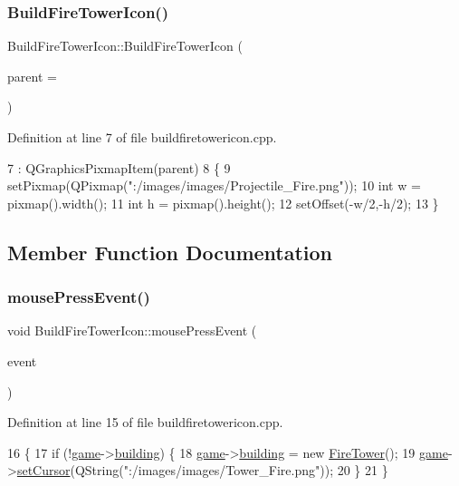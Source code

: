 \subsubsection{\texorpdfstring{Build\+Fire\+Tower\+Icon()}{BuildFireTowerIcon()}}
{\footnotesize\ttfamily Build\+Fire\+Tower\+Icon\+::\+Build\+Fire\+Tower\+Icon (\begin{DoxyParamCaption}\item[{Q\+Graphics\+Item $\ast$}]{parent = {} }\end{DoxyParamCaption})}



Definition at line 7 of file buildfiretowericon.\+cpp.


\begin{DoxyCode}
7                                                            : QGraphicsPixmapItem(parent)
8 \{
9     setPixmap(QPixmap(\textcolor{stringliteral}{":/images/images/Projectile\_Fire.png"}));
10     \textcolor{keywordtype}{int} w = pixmap().width();
11     \textcolor{keywordtype}{int} h = pixmap().height();
12     setOffset(-w/2,-h/2);
13 \}
\end{DoxyCode}


\subsection{Member Function Documentation}
\mbox{\label{class_build_fire_tower_icon_a878a78832a73bac6245ec0ae5bce5c60}} 
\subsubsection{\texorpdfstring{mouse\+Press\+Event()}{mousePressEvent()}}
{\footnotesize\ttfamily void Build\+Fire\+Tower\+Icon\+::mouse\+Press\+Event (\begin{DoxyParamCaption}\item[{Q\+Graphics\+Scene\+Mouse\+Event $\ast$}]{event }\end{DoxyParamCaption})}



Definition at line 15 of file buildfiretowericon.\+cpp.


\begin{DoxyCode}
16 \{
17     \textcolor{keywordflow}{if} (!\hyperlink{buildfiretowericon_8cpp_a58bdb5643d0814ac4e697a1564b79b70}{game}->\hyperlink{class_game_a5917b4e021a93be7666ebc2ef4529401}{building}) \{
18         \hyperlink{buildfiretowericon_8cpp_a58bdb5643d0814ac4e697a1564b79b70}{game}->\hyperlink{class_game_a5917b4e021a93be7666ebc2ef4529401}{building} = \textcolor{keyword}{new} \hyperlink{class_fire_tower}{FireTower}();
19         \hyperlink{buildfiretowericon_8cpp_a58bdb5643d0814ac4e697a1564b79b70}{game}->\hyperlink{class_game_a7272e282812b8af0be83044db196dc6c}{setCursor}(QString(\textcolor{stringliteral}{":/images/images/Tower\_Fire.png"}));
20     \}
21 \}
\end{DoxyCode}


